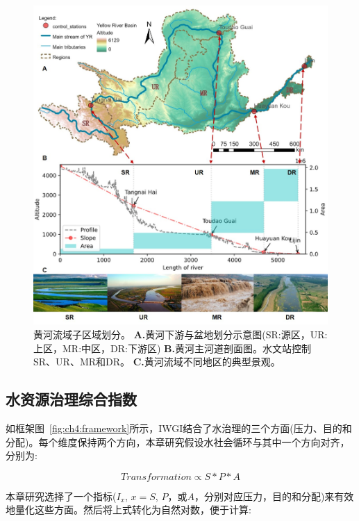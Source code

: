 \begin{figure}[hbtp!]
\centering
\includegraphics[width=\textwidth]{img/ch4/s1_study_area.jpg}
\caption[黄河流域子区域划分]{黄河流域子区域划分。
    \textbf{A.}黄河下游与盆地划分示意图(SR:源区，UR:上区，MR:中区，DR:下游区)
    \textbf{B.}黄河主河道剖面图。水文站控制SR、UR、MR和DR。
    \textbf{C.}黄河流域不同地区的典型景观。
}
\label{fig:YRB}
\end{figure}


\subsection{水资源治理综合指数}

如框架图~\ref{fig:ch4:framework}所示，IWGI结合了水治理的三个方面(压力、目的和分配)。每个维度保持两个方向，本章研究假设水社会循环与其中一个方向对齐，分别为:

\begin{equation}
    Transformation \propto S*P*A
\end{equation}

本章研究选择了一个指标($I_x$, $x=S$, $P$，或$A$，分别对应压力，目的和分配)来有效地量化这些方面。然后将上式转化为自然对数，便于计算:


